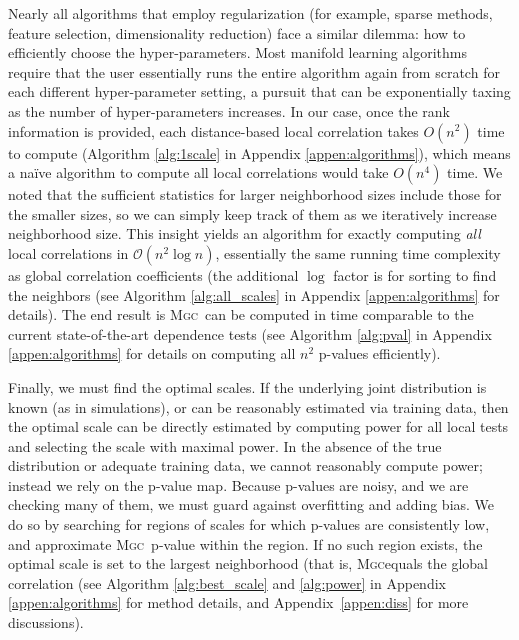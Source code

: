 \documentclass[11pt]{article}
\providecommand{\sct}[1]{{\normalfont\textsc{#1}}}
\providecommand{\mc}[1]{\mathcal{#1}}
\newcommand{\Mgc}{\sct{Mgc}}
\begin{document}
Nearly all algorithms that employ regularization (for example, sparse methods, feature selection, dimensionality reduction) face a similar dilemma: how to efficiently choose the hyper-parameters.
% 
Most manifold learning algorithms require that the user essentially runs the entire algorithm again from scratch for each different hyper-parameter setting, a pursuit that can be exponentially taxing as the number of hyper-parameters increases.
In our case, once the rank information is provided, each distance-based local correlation takes $O(n^2)$ time to compute (Algorithm \ref{alg:1scale} in Appendix \ref{appen:algorithms}), which means a na\"ive algorithm to compute all local correlations would take $O(n^4)$ time.
% 
We noted that the sufficient statistics for larger neighborhood sizes include those for the smaller sizes, so we can simply keep track of them as we iteratively increase neighborhood size. 
This insight yields an algorithm for exactly computing \emph{all} local correlations in $\mc{O}(n^2 \log n)$, essentially the same running time complexity as  global correlation coefficients (the additional $\log$ factor is for sorting to find the neighbors  (see Algorithm \ref{alg:all_scales} in Appendix \ref{appen:algorithms} for details). 
The end result is \Mgc~can be computed in  time comparable to the current state-of-the-art dependence tests (see Algorithm \ref{alg:pval} in Appendix \ref{appen:algorithms} for details on computing all $n^2$ p-values efficiently).
% 

Finally, we must find the optimal scales. If the underlying joint distribution is known (as in simulations), or can be reasonably estimated via training data, then the optimal scale can be directly estimated by computing power for all local tests and selecting the scale with maximal power. In the absence of the true distribution or adequate training data, we cannot reasonably compute power; instead we rely on the p-value map.  Because p-values are noisy, and we are checking many of them, we must guard against overfitting and adding bias.  We do so by searching for regions of scales for which p-values are consistently low, and approximate \Mgc~p-value within the region. If no such region exists, the optimal scale is set to the largest neighborhood (that is, \Mgc equals the global correlation 
(see Algorithm \ref{alg:best_scale} and \ref{alg:power} in Appendix \ref{appen:algorithms} for method details, and Appendix~\ref{appen:diss} for more discussions).
\end{document}
